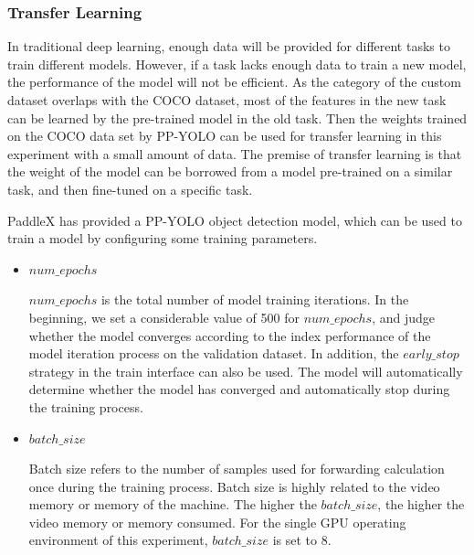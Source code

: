 \documentclass[journal,article,submit,moreauthors,pdftex]{Definitions/mdpi}
\begin{document}
\subsubsection{Transfer Learning}

In traditional deep learning, enough data will be provided for different tasks to train different models. However, if a task lacks enough data to train a new model, the performance of the model will not be efficient. As the category of the custom dataset overlaps with the COCO dataset, most of the features in the new task can be learned by the pre-trained model in the old task. Then the weights trained on the COCO data set by PP-YOLO can be used for transfer learning in this experiment with a small amount of data. The premise of transfer learning is that the weight of the model can be borrowed from a model pre-trained on a similar task, and then fine-tuned on a specific task.

PaddleX has provided a PP-YOLO object detection model, which can be used to train a model by configuring some training parameters.




\begin{itemize}
\item{$num\_epochs$}

$num\_epochs$ is the total number of model training iterations. In the beginning, we set a considerable value of 500 for $num\_epochs$, and judge whether the model converges according to the index performance of the model iteration process on the validation dataset. In addition, the $early\_stop$ strategy in the train interface can also be used. The model will automatically determine whether the model has converged and automatically stop during the training process.

\end{itemize}

\begin{itemize}
\item{$batch\_size$}

Batch size refers to the number of samples used for forwarding calculation once during the training process. Batch size is highly related to the video memory or memory of the machine. The higher the $batch\_size$, the higher the video memory or memory consumed. For the single GPU operating environment of this experiment, $batch\_size$ is set to 8.
\end{itemize}

\end{document}
